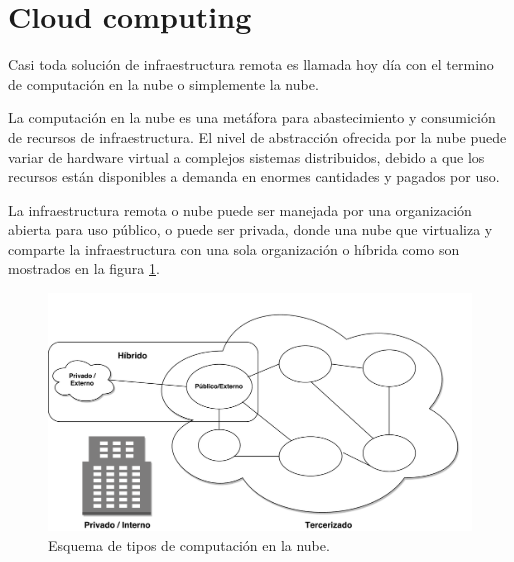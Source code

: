 \section{Cloud computing}
Casi toda solución de infraestructura remota es llamada hoy día con el termino de computación en la nube o simplemente la nube.

La computación en la nube es una metáfora para abastecimiento y consumición de recursos de infraestructura. El nivel de abstracción ofrecida por la nube puede variar de hardware virtual a complejos sistemas distribuidos, debido a que los recursos están disponibles a demanda en enormes cantidades y pagados por uso\citep{wittig_amazon_2016}.

La infraestructura remota o nube puede ser manejada por una organización abierta para uso público, o puede ser privada, donde una nube que virtualiza y comparte la infraestructura con una sola organización o híbrida como son mostrados en la figura \ref{cloud_types}.

\begin{figure}[H]
\centering
\includegraphics[width=125mm,scale=1]{Figuras/cloud_computing_types}
\caption{Esquema de tipos de computación en la nube.}
  \label{cloud_types}
\end{figure}